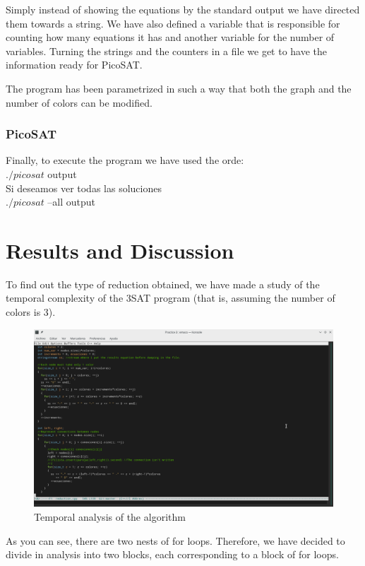 \documentclass{article}
\begin{document}
        Simply instead of showing the equations by the standard output we have directed them towards a string. 
        We have also defined a variable that is responsible for counting how many equations it has and another 
        variable for the number of variables. Turning the strings and the counters in a file we get to have the information ready 
        for PicoSAT.

        The program has been parametrized in such a way that both the graph and the number of colors can be modified.  
    
    \subsubsection{PicoSAT}
        Finally, to execute the program we have used the orde: \\
         \vspace{5mm} $./picosat$ output \\

        Si deseamos ver todas las soluciones \\
         \vspace{5mm} $./picosat$ --all output


\section{Results and Discussion}
    To find out the type of reduction obtained, we have made a study of the temporal complexity 
    of the 3SAT program (that is, assuming the number of colors is 3). 
    \begin{figure}[H]
        \centering
        \includegraphics[width=1\textwidth]{pictures/analisis.png}
        \caption{Temporal analysis of the algorithm}
    \end{figure}
    As you can see, there are two nests of for loops. Therefore, we have decided to 
    divide in analysis into two blocks, each corresponding to a block of for loops. 
\end{document}
